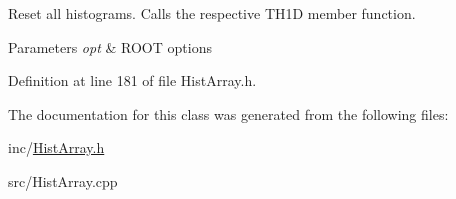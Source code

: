 Reset all histograms. Calls the respective T\+H1\+D member function. 


\begin{DoxyParams}{Parameters}
{\em opt} & R\+O\+O\+T options \\
\hline
\end{DoxyParams}


Definition at line 181 of file Hist\+Array.\+h.



The documentation for this class was generated from the following files\+:\begin{DoxyCompactItemize}
\item 
inc/\hyperlink{HistArray_8h}{Hist\+Array.\+h}\item 
src/Hist\+Array.\+cpp\end{DoxyCompactItemize}
